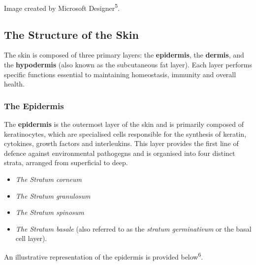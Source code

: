 \documentclass[
]{article}
\providecommand{\tightlist}{%
  \setlength{\itemsep}{0pt}\setlength{\parskip}{0pt}}
\begin{document}
Image created by Microsoft Designer\textsuperscript{5}.

\newpage

\subsection{The Structure of the Skin}\label{the-structure-of-the-skin}

The skin is composed of three primary layers: the \textbf{epidermis},
the \textbf{dermis}, and the \textbf{hypodermis} (also known as the
subcutaneous fat layer). Each layer performs specific functions
essential to maintaining homeostasis, immunity and overall health.

\subsubsection{The Epidermis}\label{the-epidermis}

The \textbf{epidermis} is the outermost layer of the skin and is
primarily composed of keratinocytes, which are specialised cells
responsible for the synthesis of keratin, cytokines, growth factors and
interleukins. This layer provides the first line of defence against
environmental pathogegns and is organised into four distinct strata,
arranged from superficial to deep.

\begin{itemize}
\tightlist
\item
  \emph{The Stratum corneum}
\item
  \emph{The Stratum granulosum}
\item
  \emph{The Stratum spinosum}
\item
  \emph{The Stratum basale} (also referred to as the \emph{stratum
  germinativum} or the basal cell layer).
\end{itemize}

An illustrative representation of the epidermis is provided
below\textsuperscript{6}.
\end{document}
